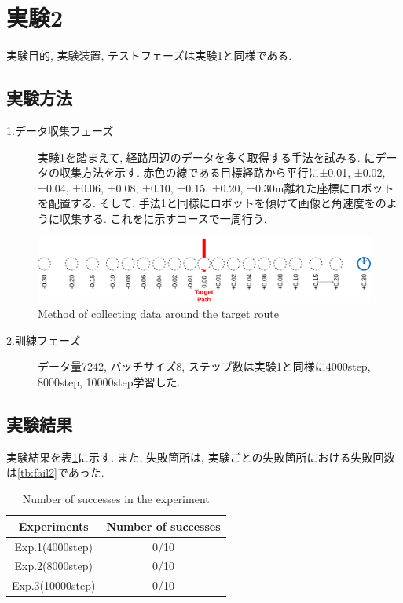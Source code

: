 \newpage
\section{実験2}
実験目的, 実験装置, テストフェーズは実験1と同様である.
\subsection{実験方法}
\begin{description}
  \item[1.データ収集フェーズ]実験1を踏まえて, 経路周辺のデータを多く取得する手法を試みる. にデータの収集方法を示す. 赤色の線である目標経路から平行に±0.01, ±0.02, ±0.04, ±0.06, ±0.08, ±0.10, ±0.15, ±0.20, ±0.30m離れた座標にロボットを配置する. そして, 手法1と同様にロボットを傾けて画像と角速度をのように収集する. これをに示すコースで一周行う.  
\end{description}

\begin{figure}[h]
  \centering
  \includegraphics[keepaspectratio, scale=0.18]{images/collect-data.png}
  \caption{Method of collecting data around the target route}
  \label{Fig:collect-data}
  \end{figure}

\begin{description}
  \item[2.訓練フェーズ]データ量7242, バッチサイズ8, ステップ数は実験1と同様に4000step, 8000step, 10000step学習した. 
\end{description}

\subsection{実験結果}
実験結果を表\ref{tb:exp2}に示す. また, 失敗箇所は, 実験ごとの失敗箇所における失敗回数は\ref{tb:fail2}であった. 

\begin{table}[h]
  \centering
  \begin{tabular}{|c|c|} \hline
    Experiments & Number of successes \\ \hline
    Exp.1(4000step) & 0/10 \\ \hline
    Exp.2(8000step) & 0/10 \\ \hline
    Exp.3(10000step) & 0/10 \\ \hline
  \end{tabular}
  \caption{Number of successes in the experiment}
  \label{tb:exp2}
\end{table}

